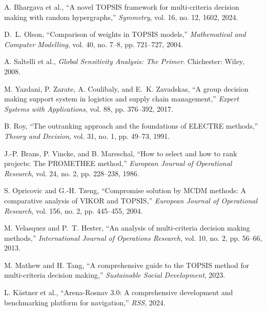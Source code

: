 \documentclass[12pt,a4paper,oneside]{book}
\begin{document}
\begin{enumerate}[label={[\arabic*]}, leftmargin=*]
\item \label{Bhargava2024} A. Bhargava et al., ``A novel TOPSIS framework for multi-criteria decision making with random hypergraphs,'' \emph{Symmetry}, vol. 16, no. 12, 1602, 2024.

\item \label{Olson2004} D.~L. Olson, ``Comparison of weights in TOPSIS models,'' \emph{Mathematical and Computer Modelling}, vol. 40, no. 7--8, pp. 721--727, 2004.

\item \label{Saltelli2008} A. Saltelli et al., \emph{Global Sensitivity Analysis: The Primer}. Chichester: Wiley, 2008.

\item \label{Yazdani2017} M. Yazdani, P. Zarate, A. Coulibaly, and E.~K. Zavadskas, ``A group decision making support system in logistics and supply chain management,'' \emph{Expert Systems with Applications}, vol. 88, pp. 376--392, 2017.

\item \label{Roy1991} B. Roy, ``The outranking approach and the foundations of ELECTRE methods,'' \emph{Theory and Decision}, vol. 31, no. 1, pp. 49--73, 1991.

\item \label{Brans1986} J.-P. Brans, P. Vincke, and B. Mareschal, ``How to select and how to rank projects: The PROMETHEE method,'' \emph{European Journal of Operational Research}, vol. 24, no. 2, pp. 228--238, 1986.

\item \label{Opricovic2004} S. Opricovic and G.-H. Tzeng, ``Compromise solution by MCDM methods: A comparative analysis of VIKOR and TOPSIS,'' \emph{European Journal of Operational Research}, vol. 156, no. 2, pp. 445--455, 2004.

\item \label{Velasquez2013} M. Velasquez and P.~T. Hester, ``An analysis of multi-criteria decision making methods,'' \emph{International Journal of Operations Research}, vol. 10, no. 2, pp. 56--66, 2013.

\item \label{Mathew2023} M. Mathew and H. Tang, ``A comprehensive guide to the TOPSIS method for multi-criteria decision making,'' \emph{Sustainable Social Development}, 2023.

\item \label{Kastner2024} L. Kästner et al., ``Arena-Rosnav 3.0: A comprehensive development and benchmarking platform for navigation,'' \emph{RSS}, 2024.


\end{enumerate}
\end{document}
